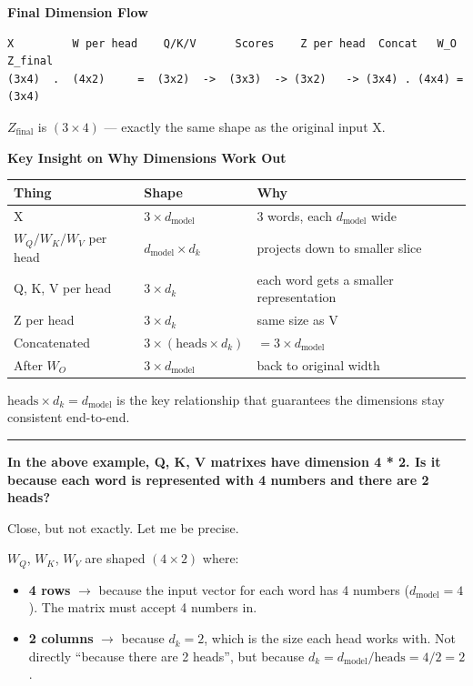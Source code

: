 \medskip
\textbf{Final Dimension Flow}

\begin{verbatim}
X         W per head    Q/K/V      Scores    Z per head  Concat   W_O     Z_final
(3x4)  .  (4x2)     =  (3x2)  ->  (3x3)  -> (3x2)   -> (3x4) . (4x4) = (3x4)
\end{verbatim}

$Z_{\mathrm{final}}$ is $(3 \times 4)$ --- exactly the same shape as the original input X.

\medskip
\textbf{Key Insight on Why Dimensions Work Out}

\begin{center}
\begin{tabular}{lll}
\hline
Thing & Shape & Why \\
\hline
X & $3 \times d_{\mathrm{model}}$ & 3 words, each $d_{\mathrm{model}}$ wide \\
$W_Q / W_K / W_V$ per head & $d_{\mathrm{model}} \times d_k$ & projects down to smaller slice \\
Q, K, V per head & $3 \times d_k$ & each word gets a smaller representation \\
Z per head & $3 \times d_k$ & same size as V \\
Concatenated & $3 \times (\mathrm{heads} \times d_k)$ & $= 3 \times d_{\mathrm{model}}$ \\
After $W_O$ & $3 \times d_{\mathrm{model}}$ & back to original width \\
\hline
\end{tabular}
\end{center}

$\mathrm{heads} \times d_k = d_{\mathrm{model}}$ is the key relationship that guarantees the dimensions stay consistent end-to-end.

\bigskip
\hrule
\bigskip

\textbf{In the above example, Q, K, V matrixes have dimension 4 * 2. Is it because each word is represented with 4 numbers and there are 2 heads?}

\medskip

Close, but not exactly. Let me be precise.

$W_Q$, $W_K$, $W_V$ are shaped $(4 \times 2)$ where:

\begin{itemize}
\item \textbf{4 rows} $\to$ because the input vector for each word has 4 numbers ($d_{\mathrm{model}} = 4$). The matrix must accept 4 numbers in.
\item \textbf{2 columns} $\to$ because $d_k = 2$, which is the size each head works with. Not directly ``because there are 2 heads'', but because $d_k = d_{\mathrm{model}} / \mathrm{heads} = 4/2 = 2$.
\end{itemize}


